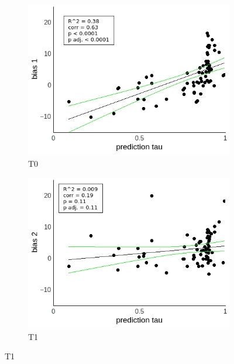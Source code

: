 \documentclass[a4paper]{scrreprt}
\begin{document}
\begin{figure}
\centering
\begin{subfigure}[b]{0.49\textwidth}
        \includegraphics[width=\textwidth]{figs/sec3/pred/pred_diff_1_mod1mod1.jpeg}
        \caption{T0}
    \end{subfigure}
    \begin{subfigure}[b]{0.49\textwidth}
        \includegraphics[width=\textwidth]{figs/sec3/pred/pred_diff_2_mod1mod1.jpeg}
        \caption{T1}
    \end{subfigure}


\end{figure}
\end{document}
